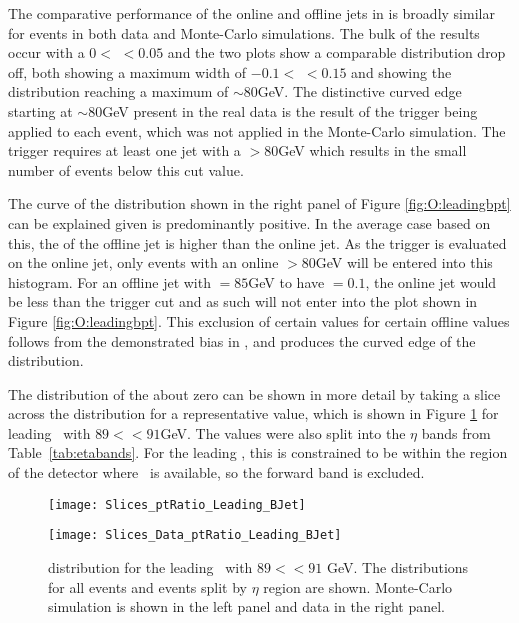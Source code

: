 		\newpage
		The comparative performance of the online and offline jets in \pt is broadly similar for events in both data and Monte-Carlo simulations. The bulk of the results occur with a $0<$ \dptpt$<0.05$ and the two plots show a comparable distribution drop off, both showing a maximum \dptpt width of $-0.1 <$ \dptpt$<0.15$ and showing the \pt distribution reaching a maximum of $\sim80$GeV. The distinctive curved edge starting at \pt$\sim80$GeV present in the real data is the result of the trigger being applied to each event, which was not applied in the Monte-Carlo simulation. The trigger requires at least one jet with a \pt$>80$GeV which results in the small number of events below this cut value.

		The curve of the distribution shown in the right panel of Figure \ref{fig:O:leadingbpt} can be explained given \dptpt is predominantly positive. In the average case based on this, the \pt of the offline jet is higher than the online jet. As the trigger is evaluated on the online jet, only events with an online \pt$>80$GeV will be entered into this histogram. For an offline jet with \pt$=85$GeV to have \dptpt$=0.1$, the online jet would be less than the trigger \pt cut and as such will not enter into the plot shown in Figure \ref{fig:O:leadingbpt}. This exclusion of certain \dptpt values for certain offline \pt values follows from the demonstrated bias in \dptpt, and produces the curved edge of the distribution.

		The distribution of the \dptpt about zero can be shown in more detail by taking a slice across the distribution for a representative \pt value, which is shown in Figure \ref{fig:O:leadingbptslice} for leading \bjets\ with $89< $\pt$<91$GeV. The \dptpt values were also split into the $\eta$ bands from Table~\ref{tab:etabands}. For the leading \bjet, this is constrained to be within the region of the detector where \btag\, is available, so the forward band is excluded.

		\begin{figure}[h]
			\centering

			\begin{minipage}[h]{0.48\linewidth}
				\texttt{[image: Slices\_ptRatio\_Leading\_BJet]}
			\end{minipage}
			\quad
			\begin{minipage}[h]{0.48\linewidth}
				\texttt{[image: Slices\_Data\_ptRatio\_Leading\_BJet]}
			\end{minipage}
			\caption[\dptpt distribution for leading \bjets\ with $89<$\pt$<91$ in data and Monte-Carlo simulations]{\dptpt distribution for the leading \bjet\ with $89<$\pt$<91$ GeV. The distributions for all events and events split by $\eta$ region are shown. Monte-Carlo simulation is shown in the left panel and data in the right panel.}
			\label{fig:O:leadingbptslice}
		\end{figure}

